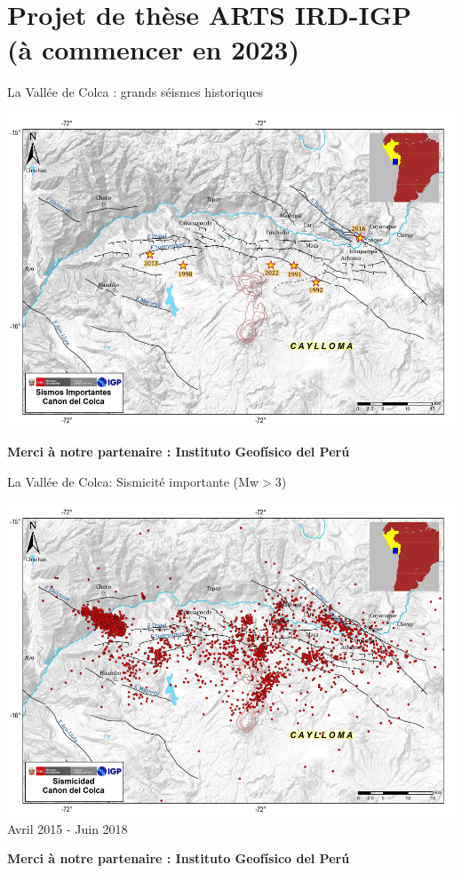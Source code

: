 \documentclass{beamer}
\begin{document}
\section{Projet de thèse ARTS IRD-IGP \\ (à commencer en 2023)}

\begin{frame}
 {La Vallée de Colca : grands séismes historiques}

 \begin{center}
 \vskip -0.5cm  \includegraphics[width=0.9\linewidth]{images/red_colca_hist.png}  \\  
 \end{center}

 \hfill {\bf \small Merci à notre partenaire : Instituto Geofísico del Perú}

\end{frame}

\begin{frame}
 {La Vallée de Colca: Sismicité importante (Mw$>$3)}
 

 \begin{center}
  \vskip -0.5cm \includegraphics[width=0.9\linewidth]{images/red_colca_large.png}  \\
  Avril 2015 - Juin 2018  
 \end{center}

 \hfill {\bf \small Merci à notre partenaire : Instituto Geofísico del Perú}
 
\end{frame}
\end{document}
